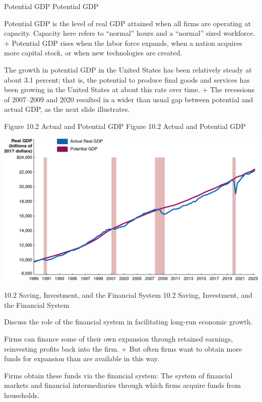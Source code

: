 \documentclass[
  12pt,
  ignorenonframetext,
]{beamer}
\begin{document}
\begin{frame}{Potential GDP}
\label{potential-gdp}
Potential GDP

Potential GDP is the level of real GDP attained when all firms are
operating at capacity. Capacity here refers to ``normal'' hours and a
``normal'' sized workforce. + Potential GDP rises when the labor force
expands, when a nation acquires more capital stock, or when new
technologies are created.

The growth in potential GDP in the United States has been relatively
steady at about 3.1 percent; that is, the potential to produce final
goods and services has been growing in the United States at about this
rate over time. + The recessions of 2007--2009 and 2020 resulted in a
wider than usual gap between potential and actual GDP, as the next slide
illustrates.
\end{frame}

\begin{frame}{Figure 10.2 Actual and Potential GDP}
\label{figure-10.2-actual-and-potential-gdp}
Figure 10.2 Actual and Potential GDP

\includegraphics[width=\textwidth,height=0.99\textheight]{imgs3/img_slide18a.png}
\end{frame}

\begin{frame}{10.2 Saving, Investment, and the Financial System}
\label{saving-investment-and-the-financial-system}
10.2 Saving, Investment, and the Financial System

Discuss the role of the financial system in facilitating long-run
economic growth.

Firms can finance some of their own expansion through retained earnings,
reinvesting profits back into the firm. + But often firms want to obtain
more funds for expansion than are available in this way.

Firms obtain these funds via the financial system: The system of
financial markets and financial intermediaries through which firms
acquire funds from households.
\end{frame}
\end{document}
